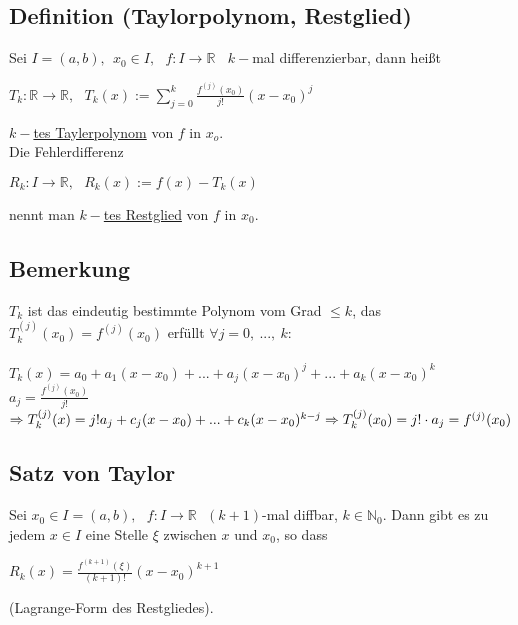 \documentclass[a4paper, 12pt,titlepage, pdf, headsepline]{article}
\newcommand{\R}{\mathds{R}}
\newcommand{\N}{\mathds{N}}
\newcommand{\uline}[1]{\underline{#1}}
\renewcommand{\>}{\rightarrow}
\renewcommand{\*}{\cdot}
\begin{document}
\subsection{Definition (Taylorpolynom, Restglied)}
Sei $I = (a,b),~~ x_0 \in I,~~~ f:I \rightarrow \R~~~~k-$mal differenzierbar, dann heißt \begin{center}
	$T_k :\R \rightarrow \R,~~~T_k(x) := \sum_{j = 0}^{k}\frac{f^{(j)} (x_0)}{j!}(x-x_0)^j$
\end{center}
\uline{$k-$tes Taylerpolynom} von $f$ in $x_o$. \\
Die Fehlerdifferenz \begin{center}
	$R_k: I \rightarrow \R,~~~ R_k(x) := f(x) - T_k(x)$
\end{center} nennt man \uline{$k-$tes Restglied} von $f$ in $x_0$. 
\subsection{Bemerkung}
$T_k$ ist das eindeutig bestimmte Polynom vom Grad $\leq k$, das $T_k^{(j)}(x_0) = f^{(j)}(x_0)$ erfüllt $\forall j = 0,~...,~k$:\\
\\
$T_k(x) = a_0 + a_1(x-x_0) + ... + a_j(x-x_0)^j + ... + a_k(x-x_0)^k$\\
$a_j = \frac{f^{(j)}(x_0)}{j!}$\\
$\Rightarrow T_k^{(j)}(x) = j!a_j + c_j(x-x_0) + ... + c_k(x-x_0)^{k-j}\\
\Rightarrow T_k^{(j)}(x_0) = j! \cdot a_j = f^{(j)}(x_0)$
\subsection{Satz von Taylor}
\label{12.3}
Sei $x_0 \in I =(a,b),~~~ f: I \rightarrow \R~~~(k+1)$-mal diffbar, $k \in \N_0$. Dann gibt es zu jedem $x \in I$ eine Stelle $\xi$ zwischen $x$ und $x_0$, so dass
\begin{center}
	$R_k(x) = \frac{f^{(k+1)}(\xi)}{(k+1)!} (x-x_0)^{k+1}$
\end{center}
(Lagrange-Form des Restgliedes).
\end{document}
